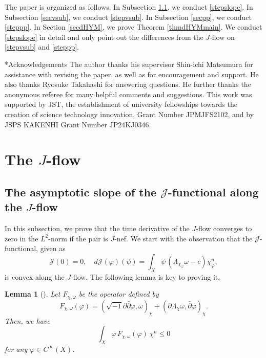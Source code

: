 \documentclass{amsart}
\numberwithin{equation}{section}
\theoremstyle{plain}
\newtheorem{lem}[equation]{Lemma}
\theoremstyle{definition}
\theoremstyle{remark}
\newcommand{\delb}{\sqrt{-1}\partial\bar{\partial}}
\begin{document}
The paper is organized as follows. In Subsection \ref{secslope}, we conduct \ref{stepslope}. In Subsection \ref{secvsub}, we conduct \ref{stepvsub}. In Subsection \ref{secpp}, we conduct \ref{steppp}. In Section \ref{secdHYM}, we prove Theorem \ref{thmdHYMmain}. We conduct \ref{stepslope} in detail and only point out the differences from the $J$-flow on \ref{stepvsub} and \ref{steppp}.

\begin{subsection}*{Acknowledgements}
The author thanks his supervisor Shin-ichi Matsumura for assistance with revising the paper, as well as for encouragement and support. He also thanks Ryosuke Takahashi for answering questions. 
He further thanks the anonymous referee for many helpful comments and suggestions.
This work was supported by JST, the establishment of university fellowships towards the creation of science technology innovation, Grant Number JPMJFS2102, and by JSPS KAKENHI Grant Number JP24KJ0346.
\end{subsection}

\section{The \texorpdfstring{$J$}{J}-flow}
\subsection{The asymptotic slope of the \texorpdfstring{$\mathcal{J}$}{J}-functional along the \texorpdfstring{$J$}{J}-flow}\label{secslope}
In this subsection, we prove that the time derivative of the $J$-flow converges to zero in the $L^2$-norm if the pair is $J$-nef. 
We start with the observation that the $\mathcal{J}$-functional, given as 
$$\mathcal{J}(0)=0,\quad d\mathcal{J}(\varphi)(\psi)=\int_X \psi\, \left(\Lambda_{\chi_\varphi}\omega-c\right)\chi_\varphi^n,$$
is convex along the $J$-flow.
The following lemma is key to proving it. 

\begin{lem}[{\cite[Lemma 1]{Hashimoto}}]\label{lemhsmt}
    Let $F_{\chi,\omega}$ be the operator defined by
    $$F_{\chi,\omega}(\varphi) = (\delb \varphi, \omega)_\chi + (\partial \Lambda_\chi \omega, \bar{\partial} \varphi)_\chi.$$
    Then, we have
    $$ \int_X \varphi \, F_{\chi,\omega}(\varphi) \, \chi^n \le 0$$
    for any $\varphi \in C^\infty(X)$.
\end{lem}
\end{document}

